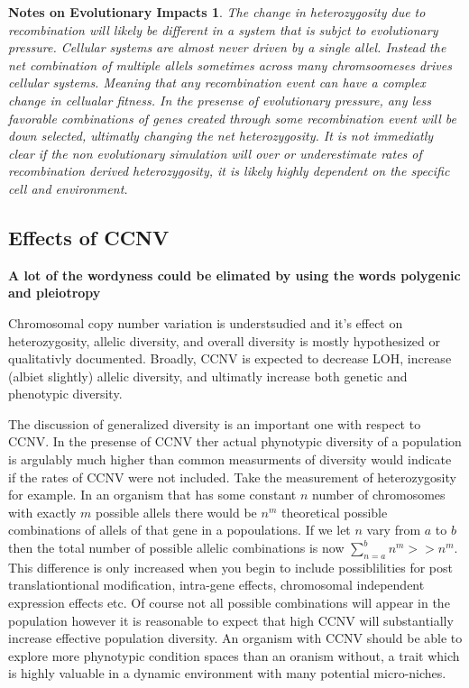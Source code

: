 \documentclass{article}
\newtheorem{evo_impacts}{Notes on Evolutionary Impacts}
\begin{document}
    \begin{evo_impacts}
        The change in heterozygosity due to recombination will likely be different in a system that is subjct to evolutionary pressure.  Cellular systems are almost never driven by a single allel.  Instead the net combination of multiple allels sometimes across many chromsoomeses drives cellular systems.  Meaning that any recombination event can have a complex change in cellualar fitness.  In the presense of evolutionary pressure, any less favorable combinations of genes created through some recombination event will be down selected, ultimatly changing the net heterozygosity.  It is not immediatly clear if the non evolutionary simulation will over or underestimate rates of recombination derived heterozygosity, it is likely highly dependent on the specific cell and environment.
    \end{evo_impacts}
    

    

    \subsection{Effects of CCNV} 

    \textbf{A lot of the wordyness could be elimated by using the words polygenic and pleiotropy}

    Chromosomal copy number variation is understsudied and it's effect on heterozygosity, allelic diversity, and overall diversity is mostly hypothesized or qualitativly documented.  Broadly, CCNV is expected to decrease LOH, increase (albiet slightly) allelic diversity, and ultimatly increase both genetic and phenotypic diversity.

    The discussion of generalized diversity is an important one with respect to CCNV.  In the presense of CCNV ther actual phynotypic diversity of a population is argulably much higher than common measurments of diversity would indicate if the rates of CCNV were not included.   Take the measurement of heterozygosity for example.  In an organism that has some constant \(n\) number of chromosomes with exactly \(m\) possible allels there would be \(n^m\) theoretical possible combinations of allels of that gene in a popoulations.   If we let \(n\) vary from \(a\) to \(b\) then the total number of possible allelic combinations is now \(\sum_{n=a}^{b}{n^m} >> n^m\).  This difference is only increased when you begin to include possiblilities for post translationtional modification, intra-gene effects, chromosomal independent expression effects etc.  Of course not all possible combinations will appear in the population however it is reasonable to expect that high CCNV will substantially increase effective population diversity.  An organism with CCNV should be able to explore more phynotypic condition spaces than an oranism without, a trait which is highly valuable in a dynamic environment with many potential micro-niches.
\end{document}
